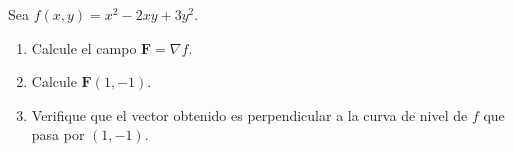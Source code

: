 Sea $f(x,y)=x^2-2xy+3y^2$.
\begin{enumerate}
    \item Calcule el campo $\mathbf{F}=\nabla f$.
    \item Calcule $\mathbf{F}(1,-1)$.
    \item Verifique que el vector obtenido es perpendicular a la curva de nivel de $f$ que pasa por $(1,-1)$.
\end{enumerate}
